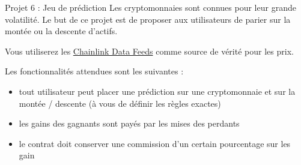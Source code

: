 \begin{frame}{Projet 6 : Jeu de prédiction}
  Les cryptomonnaies sont connues pour leur grande volatilité.
  Le but de ce projet est de proposer aux utilisateurs de parier sur la montée ou la descente d'actifs.

  Vous utiliserez les \href{https://docs.chain.link/data-feeds/price-feeds}{Chainlink Data Feeds} comme source de vérité pour les prix.

  Les fonctionnalités attendues sont les suivantes :

  \begin{itemize}
    \item tout utilisateur peut placer une prédiction sur une cryptomonnaie et sur la montée / descente (à vous de définir les règles exactes)
    \item les gains des gagnants sont payés par les mises des perdants
    \item le contrat doit conserver une commission d'un certain pourcentage sur les gain
  \end{itemize}
\end{frame}